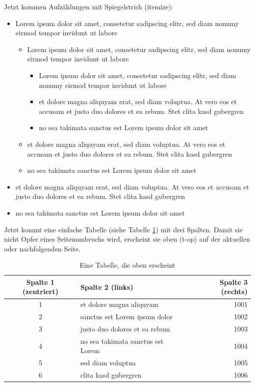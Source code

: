 Jetzt kommen Aufzählungen mit Spiegelstrich (itemize):
\begin{itemize}
\item
Lorem ipsum dolor sit amet, consetetur sadipscing elitr, sed diam nonumy eirmod tempor invidunt ut labore
   \begin{itemize}
   \item
Lorem ipsum dolor sit amet, consetetur sadipscing elitr, sed diam nonumy eirmod tempor invidunt ut labore
      \begin{itemize}
      \item
Lorem ipsum dolor sit amet, consetetur sadipscing elitr, sed diam nonumy eirmod tempor invidunt ut labore
      \item
et dolore magna aliquyam erat, sed diam voluptua. At vero eos et accusam et justo duo dolores et ea rebum. Stet clita kasd gubergren
      \item
no sea takimata sanctus est Lorem ipsum dolor sit amet
      \end{itemize}
\item
et dolore magna aliquyam erat, sed diam voluptua. At vero eos et accusam et justo duo dolores et ea rebum. Stet clita kasd gubergren
   \item
no sea takimata sanctus est Lorem ipsum dolor sit amet
   \end{itemize}
\item
et dolore magna aliquyam erat, sed diam voluptua. At vero eos et accusam et justo duo dolores et ea rebum. Stet clita kasd gubergren
\item
no sea takimata sanctus est Lorem ipsum dolor sit amet
\end{itemize}

Jetzt kommt eine einfache Tabelle  (siehe Tabelle \ref{table01}) mit drei Spalten. Damit sie nicht Opfer eines Seitenumbruchs wird, erscheint sie oben (t-op) auf der aktuellen oder nachfolgenden Seite.

\begin{table}[t]

\begin{tabular}{|c|l|r|}
\hline
Spalte 1 (zentriert)& Spalte 2 (links)& Spalte 3 (rechts)\\
\hline
\hline
1 & et dolore magna aliquyam & 1001 \\
\hline
2 & sanctus est Lorem ipsum dolor & 1002 \\
\hline
3 & justo duo dolores et ea rebum & 1003 \\
\hline
4 & no sea takimata sanctus est Lorem & 1004 \\
\hline
5 & sed diam voluptua & 1005 \\
\hline
6 & clita kasd gubergren & 1006 \\
\hline
\end{tabular}

\caption{Eine Tabelle, die oben erscheint}
\label{table01}
\end{table}

